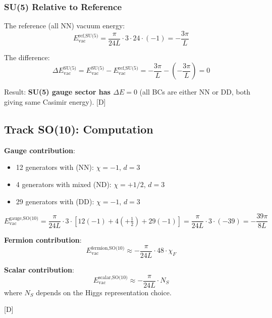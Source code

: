 \documentclass[11pt,a4paper]{article}
\newcommand{\tagD}{\textcolor{blue!70!black}{[D]}}
\begin{document}
\subsubsection{SU(5) Relative to Reference}

The reference (all NN) vacuum energy:
\begin{equation}
\label{eq:su5-ref}
E_{\text{vac}}^{\text{ref,SU(5)}} = \frac{\pi}{24L} \cdot 3 \cdot 24 \cdot (-1) = -\frac{3\pi}{L}
\end{equation}

The difference:
\begin{equation}
\label{eq:su5-delta}
\Delta E_{\text{vac}}^{\text{SU(5)}} = E_{\text{vac}}^{\text{SU(5)}} - E_{\text{vac}}^{\text{ref,SU(5)}}
= -\frac{3\pi}{L} - \left(-\frac{3\pi}{L}\right) = 0
\end{equation}

Result: \textbf{SU(5) gauge sector has $\Delta E = 0$} (all BCs are either NN or DD, both giving
same Casimir energy). \tagD

\subsection{Track SO(10): Computation}

\begin{computebox}
\textbf{Gauge contribution}:
\begin{itemize}
    \item 12 generators with (NN): $\chi = -1$, $d = 3$
    \item 4 generators with mixed (ND): $\chi = +1/2$, $d = 3$
    \item 29 generators with (DD): $\chi = -1$, $d = 3$
\end{itemize}
\begin{equation}
\label{eq:so10-gauge}
E_{\text{vac}}^{\text{gauge,SO(10)}} = \frac{\pi}{24L} \cdot 3 \cdot [12(-1) + 4(+\tfrac{1}{2}) + 29(-1)]
= \frac{\pi}{24L} \cdot 3 \cdot (-39) = -\frac{39\pi}{8L}
\end{equation}

\textbf{Fermion contribution}:
\begin{equation}
\label{eq:so10-ferm}
E_{\text{vac}}^{\text{fermion,SO(10)}} \approx -\frac{\pi}{24L} \cdot 48 \cdot \chi_F
\end{equation}

\textbf{Scalar contribution}:
\begin{equation}
\label{eq:so10-scalar}
E_{\text{vac}}^{\text{scalar,SO(10)}} \approx -\frac{\pi}{24L} \cdot N_S
\end{equation}
where $N_S$ depends on the Higgs representation choice.

\tagD
\end{computebox}
\end{document}
